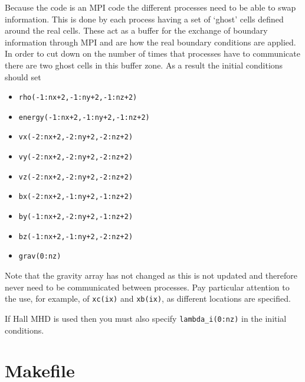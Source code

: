 \documentclass[11pt]{article}
\begin{document}
Because the code is an MPI code the different processes need to be able to swap information. This is done by each process having a set of `ghost' cells defined around the real cells. These act as a buffer for the exchange of boundary information through MPI and are how the real boundary conditions are applied. In order to cut down on the number of times that processes have to communicate there are two ghost cells in this buffer zone. As a result the initial conditions should set
\begin{itemize}
\item \texttt{rho(-1:nx+2,-1:ny+2,-1:nz+2)}
\item \texttt{energy(-1:nx+2,-1:ny+2,-1:nz+2)}
\item \texttt{vx(-2:nx+2,-2:ny+2,-2:nz+2)}
\item \texttt{vy(-2:nx+2,-2:ny+2,-2:nz+2)}
\item \texttt{vz(-2:nx+2,-2:ny+2,-2:nz+2)}
\item \texttt{bx(-2:nx+2,-1:ny+2,-1:nz+2)}
\item \texttt{by(-1:nx+2,-2:ny+2,-1:nz+2)}
\item \texttt{bz(-1:nx+2,-1:ny+2,-2:nz+2)}
\item \texttt{grav(0:nz)}
\end{itemize}
Note that the gravity array has not changed as this is not updated and therefore never need to be communicated between processes.  Pay particular attention to the use, for example, of \texttt{xc(ix)} and \texttt{xb(ix)}, as different locations are specified.      

If Hall MHD is used then you must also specify \texttt{lambda\_i(0:nz)} in the initial conditions.   

\section{Makefile}
\end{document}
